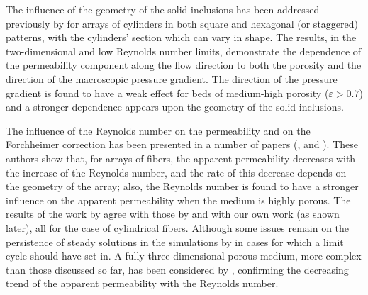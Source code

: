 The influence of the geometry of the solid inclusions has been addressed previously by \citet{yazdchi2011} for arrays of cylinders 
in both square and hexagonal (or staggered) patterns, with the cylinders' section which can vary in shape. The results, in the 
two-dimensional and low Reynolds number limits, demonstrate the dependence of the  permeability component along the flow direction to both 
the porosity and the direction of the macroscopic pressure gradient. The direction of the pressure gradient is found to have a weak effect 
for beds of medium-high porosity ($\varepsilon>0.7$) and a stronger dependence appears upon the geometry of the solid inclusions. 

The influence of the Reynolds number on the permeability and on the Forchheimer correction has been presented in a number of papers (\citet{firdaouss1997nonlinear}, \citet{penha2011computing} and \citet{edwards1990}). These authors show that, for arrays of fibers, the apparent permeability decreases with the increase of the Reynolds number, and the rate of this decrease depends on the geometry of the array;
also, the Reynolds number is found to have a stronger influence on the apparent permeability when the medium is highly porous.
The results of the work by \citet{edwards1990} agree with those by \citet{zampogna2016fluid} and with our own work (as shown later), all for
the case of cylindrical fibers. Although some issues remain on the persistence of steady solutions in the simulations by \citet{edwards1990} 
in cases for which a limit cycle should have set in. A fully three-dimensional porous medium, more complex than those discussed so far, 
has been considered by \citet{soulaine2014}, confirming the decreasing trend of the apparent permeability with the Reynolds number. 

